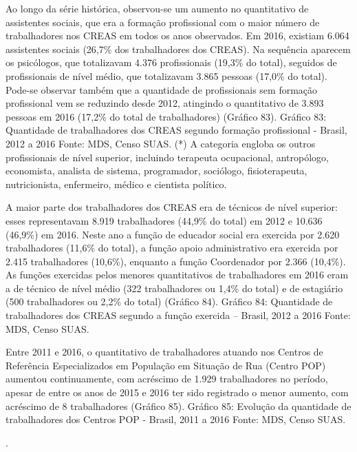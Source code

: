 \documentclass[
  brazilian]{report}
\begin{document}
Ao longo da série histórica, observou-se um aumento no quantitativo de
assistentes sociais, que era a formação profissional com o maior número
de trabalhadores nos CREAS em todos os anos observados. Em 2016,
existiam 6.064 assistentes sociais (26,7\% dos trabalhadores dos CREAS).
Na sequência aparecem os psicólogos, que totalizavam 4.376 profissionais
(19,3\% do total), seguidos de profissionais de nível médio, que
totalizavam 3.865 pessoas (17,0\% do total). Pode-se observar também que
a quantidade de profissionais sem formação profissional vem se reduzindo
desde 2012, atingindo o quantitativo de 3.893 pessoas em 2016 (17,2\% do
total de trabalhadores) (Gráfico 83). Gráfico 83: Quantidade de
trabalhadores dos CREAS segundo formação profissional - Brasil, 2012 a
2016 Fonte: MDS, Censo SUAS. (*) A categoria engloba os outros
profissionais de nível superior, incluindo terapeuta ocupacional,
antropólogo, economista, analista de sistema, programador, sociólogo,
fisioterapeuta, nutricionista, enfermeiro, médico e cientista político.

A maior parte dos trabalhadores dos CREAS era de técnicos de nível
superior: esses representavam 8.919 trabalhadores (44,9\% do total) em
2012 e 10.636 (46,9\%) em 2016. Neste ano a função de educador social
era exercida por 2.620 trabalhadores (11,6\% do total), a função apoio
administrativo era exercida por 2.415 trabalhadores (10,6\%), enquanto a
função Coordenador por 2.366 (10,4\%). As funções exercidas pelos
menores quantitativos de trabalhadores em 2016 eram a de técnico de
nível médio (322 trabalhadores ou 1,4\% do total) e de estagiário (500
trabalhadores ou 2,2\% do total) (Gráfico 84). Gráfico 84: Quantidade de
trabalhadores dos CREAS segundo a função exercida -- Brasil, 2012 a 2016
Fonte: MDS, Censo SUAS.

Entre 2011 e 2016, o quantitativo de trabalhadores atuando nos Centros
de Referência Especializados em População em Situação de Rua (Centro
POP) aumentou continuamente, com acréscimo de 1.929 trabalhadores no
período, apesar de entre os anos de 2015 e 2016 ter sido registrado o
menor aumento, com acréscimo de 8 trabalhadores (Gráfico 85). Gráfico
85: Evolução da quantidade de trabalhadores dos Centros POP - Brasil,
2011 a 2016 Fonte: MDS, Censo SUAS.

.
\end{document}

